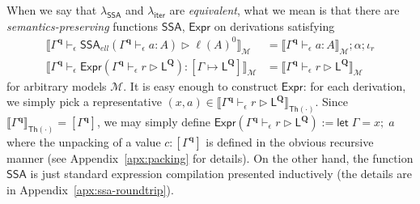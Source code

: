 \documentclass[acmsmall,screen,review]{acmart}
\newcommand{\mc}[1]{\ensuremath{\mathcal{#1}}}
\newcommand{\mb}[1]{\ensuremath{\mathbf{#1}}}
\newcommand{\ms}[1]{\ensuremath{\mathsf{#1}}}
\newcommand{\letexpr}[3]{\ensuremath{\ms{let}\;#1 = #2;\;#3}}
\newcommand{\hasty}[4]{#1 \vdash_{#2} #3: {#4}}
\newcommand{\haslb}[4]{#1 \vdash_{#2} #3 \rhd #4}
\newcommand{\tossa}[2]{\ms{SSA}_{#1}(#2)}
\newcommand{\etoty}[1]{[#1]}
\newcommand{\ltoty}[2]{[#1 \mapsto #2]}
\newcommand{\dnt}[1]{\llbracket{#1}\rrbracket}
\newcommand{\subiterexp}{\texorpdfstring{\(\lambda_{\ms{iter}}\)}{lambda-iter}}
\newcommand{\isotopessa}{\(\lambda_{\ms{SSA}}\)}
\begin{document}
When we say that \isotopessa{} and \subiterexp{} are \emph{equivalent}, what we mean is that there
are \emph{semantics-preserving} functions $\ms{SSA}$, $\ms{Expr}$ on derivations satisfying
\begin{align*}
\dnt{
  \haslb{\Gamma^{\mb{q}}}{\epsilon}{\tossa{ell}{\hasty{\Gamma^{\mb{q}}}{\epsilon}{a}{A}}}
  {\ell(A)^0}
}_{\mc{M}} &= \dnt{\hasty{\Gamma^{\mb{q}}}{\epsilon}{a}{A}}_{\mc{M}} ; \alpha ; \iota_r \\
\dnt{
  \hasty{\Gamma^{\mb{q}}}{\epsilon}
    {\ms{Expr}(\haslb{\Gamma^{\mb{q}}}{\epsilon}{r}{\ms{L}^{\mb{Q}}})}
    {\ltoty{\Gamma}{\ms{L}^{\mb{Q}}}}
}_{\mc{M}} &= \dnt{\haslb{\Gamma^{\mb{q}}}{\epsilon}{r}{\ms{L}^{\mb{Q}}}}_{\mc{M}}
\end{align*}
for arbitrary models $\mc{M}$. 
%
%
It is easy enough to construct $\ms{Expr}$: for each derivation,
we simply pick a representative 
$
  (x, a) \in 
  \dnt{\haslb{\Gamma^{\mb{q}}}{\epsilon}{r}{\ms{L}^{\mb{Q}}}}_{\ms{Th(\cdot)}}
$. Since $\dnt{\Gamma^{\mb{q}}}_{\ms{Th}(\cdot)} = \etoty{\Gamma^{\mb{q}}}$, we may simply define
$
\ms{Expr}(\haslb{\Gamma^{\mb{q}}}{\epsilon}{r}{\ms{L}^{\mb{Q}}}) := 
  \letexpr{\Gamma}{x}{a}
$
where the unpacking of a value $c : \etoty{\Gamma^{\mb{q}}}$ is defined in the obvious recursive
manner (see Appendix~\ref{apx:packing} for details). 
%
%
On the other hand, the function $\ms{SSA}$ is just standard expression compilation presented
inductively (the details are in Appendix~\ref{apx:ssa-roundtrip}). 
\end{document}
